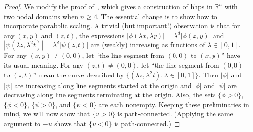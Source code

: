 \documentclass[AHL,Unicode,longabstracts,published]{cedram}
\newcommand{\R}{\mathbb{R}}
\newcommand{\R}{\mathbb{R}}
\begin{document}
\begin{proof}
We modify the proof of~\cite[Lemma~1.7]{BET17}, which gives a construction of hhps in $\R^n$ with two nodal domains when $n\geq 4$. The essential change is to show how to incorporate parabolic scaling. A trivial (but important!) observation is that for any $(x,y)$ and $(z,t)$, the expressions $|\phi(\lambda x,\lambda y)|=\lambda^d|\phi(x,y)|$ and $|\psi(\lambda z,\lambda^2t)|=\lambda^d|\psi(z,t)|$ are (weakly) increasing as functions of $\lambda\in[0,1]$. For any $(x,y)\neq (0,0)$, let ``the line segment from $(0,0)$ to $(x,y)$'' have its usual meaning. For any $(z,t)\neq (0,0)$,\pagebreak{} let ``the line segment from $(0,0)$ to $(z,t)$'' mean the curve described by $\{(\lambda z,\lambda^2 t): \lambda\in[0,1]\}$. Then $|\phi|$ and $|\psi|$ are increasing along line segments started at the origin and $|\phi|$ and $|\psi|$ are decreasing along line segments terminating at the origin. Also, the sets $\{\phi>0\}$, $\{\phi<0\}$, $\{\psi>0\}$, and $\{\psi<0\}$ are each nonempty. Keeping these preliminaries in mind, we will now show that $\{u>0\}$ is path-connected. (Applying the same argument to $-u$ shows that $\{u<0\}$ is path-connected.)


\end{proof}
\end{document}
